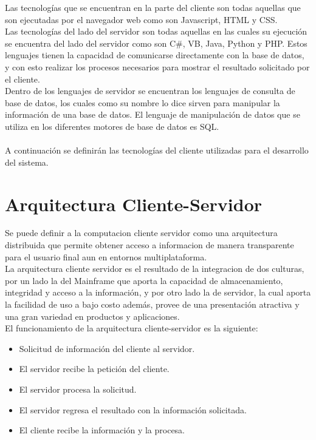 Las tecnolog\'ias que se encuentran en la parte del cliente son todas aquellas que son ejecutadas por el navegador web como son Javascript, HTML y CSS.\\

Las tecnolog\'ias del lado del servidor son todas aquellas en las cuales su ejecuci\'on se encuentra del lado del servidor como son C\#, VB, Java, Python y PHP. Estos lenguajes tienen la capacidad de comunicarse directamente con la base de datos, y con esto realizar los procesos necesarios para mostrar el resultado solicitado por el cliente.\\ 	

Dentro de los lenguajes de servidor se encuentran los lenguajes de consulta de base de datos, los cuales como su nombre lo dice sirven para manipular la informaci\'on de una base de datos. El lenguaje de manipulaci\'on de datos que se utiliza en los diferentes motores de base de datos es SQL.\\ \\
A continuaci\'on se definir\'an las tecnolog\'ias del cliente utilizadas para el desarrollo del sistema.
\section{Arquitectura Cliente-Servidor}

Se puede definir a la computacion cliente servidor  como una arquitectura  distribuida que permite obtener acceso a informacion de manera transparente para el usuario final aun en entornos multiplataforma.\\

La arquitectura cliente servidor es el resultado de la integracion de dos culturas, por un lado la del Mainframe que aporta la capacidad de almacenamiento, integridad y acceso a la informaci\'on, y por otro lado la de servidor, la cual aporta la facilidad de uso a bajo costo adem\'as, provee de una presentaci\'on atractiva y una gran variedad en productos y aplicaciones.\\

El funcionamiento de la arquitectura cliente-servidor es la siguiente:

\begin{itemize}
	\item Solicitud de informaci\'on del cliente al servidor.
	\item El servidor recibe la petici\'on del cliente.
	\item El servidor procesa la solicitud.
	\item El servidor regresa el resultado con la informaci\'on solicitada.
	\item El cliente recibe la informaci\'on y la procesa.
\end{itemize}

